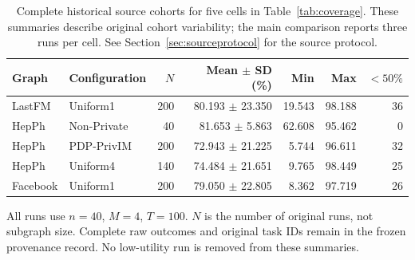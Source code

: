 \begin{table}[htbp]
\centering\scriptsize
\caption{Complete historical source cohorts for five cells in Table~\ref{tab:coverage}. These summaries describe original cohort variability; the main comparison reports three runs per cell. See Section~\ref{sec:sourceprotocol} for the source protocol.}\label{tab:subsetcohorts}
\begin{tabular}{llrrrrr}
\toprule
Graph & Configuration & $N$ & Mean $\pm$ SD (\%) & Min & Max & $<50\%$\\ \midrule
LastFM & Uniform1 & 200 & 80.193 $\pm$ 23.350 & 19.543 & 98.188 & 36 \\
HepPh & Non-Private & 40 & 81.653 $\pm$ 5.863 & 62.608 & 95.462 & 0 \\
HepPh & PDP-PrivIM & 200 & 72.943 $\pm$ 21.225 & 5.744 & 96.611 & 32 \\
HepPh & Uniform4 & 140 & 74.484 $\pm$ 21.651 & 9.765 & 98.449 & 25 \\
Facebook & Uniform1 & 200 & 79.050 $\pm$ 22.805 & 8.362 & 97.719 & 26 \\
\bottomrule\end{tabular}
\par\vspace{3pt}\begin{minipage}{.97\textwidth}\footnotesize All runs use $n=40$, $M=4$, $T=100$. $N$ is the number of original runs, not subgraph size. Complete raw outcomes and original task IDs remain in the frozen provenance record. No low-utility run is removed from these summaries.\end{minipage}
\end{table}
